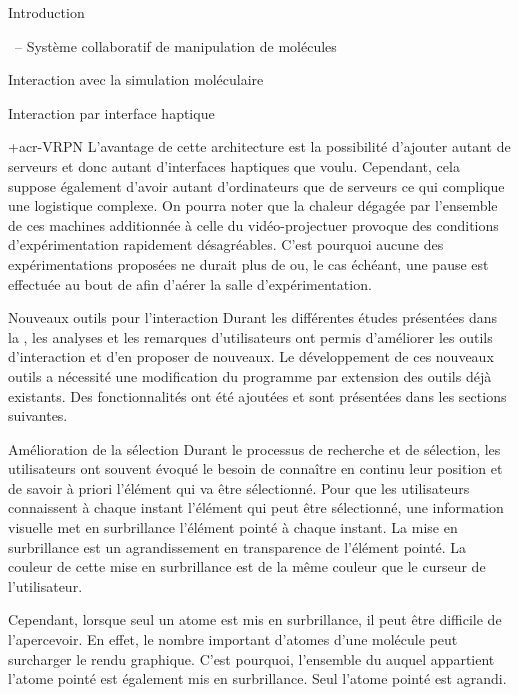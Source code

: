 \documentclass[myfrancais]{mythesis}
\begin{document}
\begin{mypart}{Introduction}
\begin{mychapter}{\myShaddock\ -- Système collaboratif de manipulation de molécules}
\begin{mysection}{Interaction avec la simulation moléculaire}
\begin{mysubsection}{Interaction par interface haptique}
\begin{mysubsubsection}{\myacronl+{acr-VRPN}}
						L'avantage de cette architecture est la possibilité d'ajouter autant de serveurs et donc autant d'interfaces haptiques que voulu.
						Cependant, cela suppose également d'avoir autant d'ordinateurs que de serveurs ce qui complique une logistique complexe.
						On pourra noter que la chaleur dégagée par l'ensemble de ces machines additionnée à celle du vidéo-projectuer provoque des conditions d'expérimentation rapidement désagréables.
						C'est pourquoi aucune des expérimentations proposées ne durait plus de  ou, le cas échéant, une pause est effectuée au bout de  afin d'aérer la salle d'expérimentation.
					\end{mysubsubsection}
				\end{mysubsection}
			\end{mysection}
			\begin{mysection}{Nouveaux outils pour l'interaction}
				Durant les différentes études présentées dans la , les analyses et les remarques d'utilisateurs ont permis d'améliorer les outils d'interaction et d'en proposer de nouveaux.
				Le développement de ces nouveaux outils a nécessité une modification du programme  par extension des outils déjà existants.
				Des fonctionnalités ont été ajoutées et sont présentées dans les sections suivantes.
				\begin{mysubsection}{Amélioration de la sélection}
					Durant le processus de recherche et de sélection, les utilisateurs ont souvent évoqué le besoin de connaître en continu leur position et de savoir à priori l'élément qui va être sélectionné.
					Pour que les utilisateurs connaissent à chaque instant l'élément qui peut être sélectionné, une information visuelle met en surbrillance l'élément pointé à chaque instant.
					La mise en surbrillance est un agrandissement en transparence de l'élément pointé.
					La couleur de cette mise en surbrillance est de la même couleur que le curseur de l'utilisateur.

					Cependant, lorsque seul un atome est mis en surbrillance, il peut être difficile de l'apercevoir.
					En effet, le nombre important d'atomes d'une molécule peut surcharger le rendu graphique.
					C'est pourquoi, l'ensemble du  auquel appartient l'atome pointé est également mis en surbrillance.
					Seul l'atome pointé est agrandi.


\end{mysubsection}
\end{mysection}
\end{mychapter}
\end{mypart}
\end{document}
